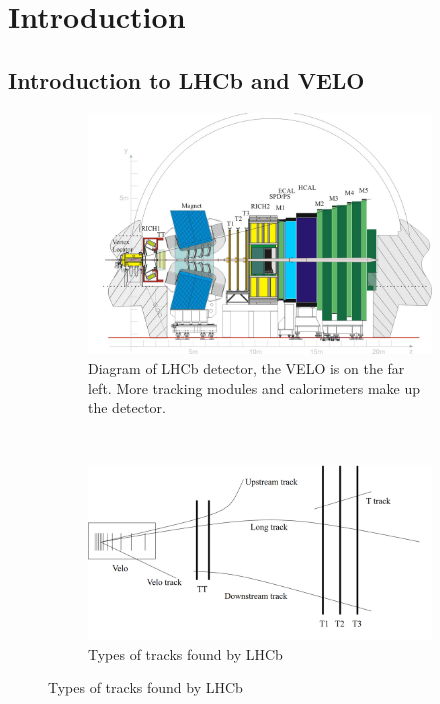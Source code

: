 
\chapter{Introduction}

\graphicspath{{Figs/}}


\section{Introduction to LHCb and VELO} %

\begin{figure}[h] %
\centering
\begin{subfigure}[t]{0.45\textwidth}
\centering
\includegraphics[width=\textwidth]{LHCbDiagram}
\caption{Diagram of LHCb detector, the VELO is on the far left. More tracking modules and calorimeters make up the detector.} 
\label{fig:LHCbDiagram} 
\end{subfigure}
~
\begin{subfigure}[t]{0.45\textwidth}
\includegraphics[width=\textwidth]{LHCbTracking}
\caption{Types of tracks found by LHCb} 
\label{fig:LHCbTracking}
\end{subfigure}
\end{figure}


